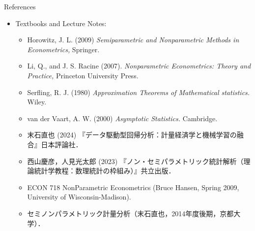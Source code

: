 \documentclass[xcolor=svgnames,dvipdfmx,cjk]{beamer}
\theoremstyle{example}
\begin{document}
\begin{frame}{References}
  \begin{itemize}
    \item Textbooks and Lecture Notes:
    \begin{itemize}
      \item Horowitz, J. L. (2009)
            \textit{Semiparametric and Nonparametric Methods in Econometrics,}
            Springer.
      \item Li, Q., and J. S. Racine (2007). 
            \textit{Nonparametric Econometrics: Theory and Practice,} 
            Princeton University Press.
      \item Serfling, R. J. (1980)
            \textit{Approximation Theorems of Mathematical statistics.} Wiley.
      \item van der Vaart, A. W. (2000)
            \textit{Asymptotic Statistics.} Cambridge.
      \item 末石直也 (2024) 『データ駆動型回帰分析：計量経済学と機械学習の融合』日本評論社．
      \item 西山慶彦，人見光太郎 (2023) 『ノン・セミパラメトリック統計解析（理論統計学教程：数理統計の枠組み）』共立出版．
      \item ECON 718 NonParametric Econometrics (Bruce Hansen, Spring 2009, University of Wisconsin-Madison).
      \item セミノンパラメトリック計量分析（末石直也，2014年度後期，京都大学）．
    \end{itemize}
  \end{itemize}
\end{frame}
\end{document}
